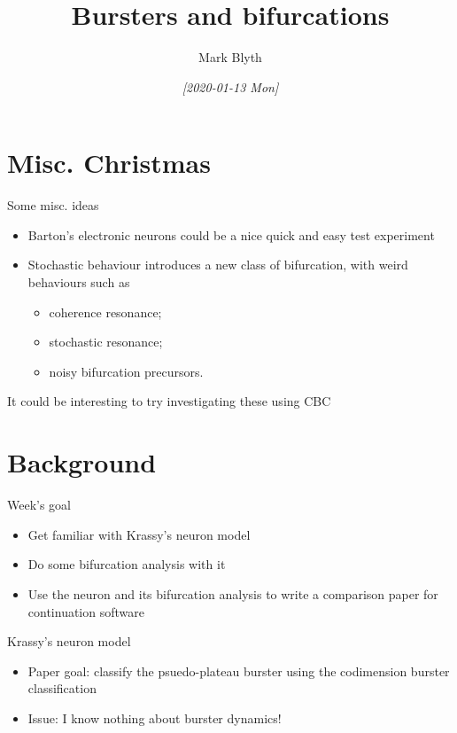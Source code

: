 \documentclass{beamer}
\author{Mark Blyth}
\date{\textit{[2020-01-13 Mon]}}
\title{Bursters and bifurcations}
\begin{document}
\maketitle

\section{Misc. Christmas}
\label{sec:org8a3b48e}
\begin{frame}[label={sec:org6da89b8}]{Some misc. ideas}
\begin{itemize}
\item Barton's electronic neurons could be a nice quick and easy test experiment
\item Stochastic behaviour introduces a new class of bifurcation, with weird behaviours such as
\begin{itemize}
\item coherence resonance;
\item stochastic resonance;
\item noisy bifurcation precursors.
\end{itemize}
\end{itemize}
It could be interesting to try investigating these using CBC
\end{frame}

\section{Background}
\label{sec:org97dc529}
\begin{frame}[label={sec:orgc375aca}]{Week's goal}
\begin{itemize}
\item Get familiar with Krassy's neuron model
\item Do some bifurcation analysis with it
\item Use the neuron and its bifurcation analysis to write a comparison paper for continuation software
\end{itemize}
\end{frame}

\begin{frame}[label={sec:orgc656269}]{Krassy's neuron model}
\begin{itemize}
\item Paper goal: classify the psuedo-plateau burster using the codimension burster classification
\item Issue: I know nothing about burster dynamics!
\end{itemize}
\end{frame}
\end{document}
